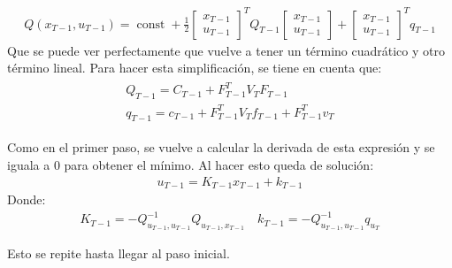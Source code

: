 \begin{align}
Q ( x _ { T - 1 } , u _ { T - 1 } ) = \operatorname { const } + \frac { 1 } { 2 } \left[ \begin{array} { c } { x _ { T - 1 } } \\ { u _ { T - 1 } } \end{array} \right] ^ { T } Q _ { T - 1 } \left[ \begin{array} { c } { x _ { T - 1 } } \\ { u _ { T - 1 } } \end{array} \right] + \left[ \begin{array} { c } { x _ { T - 1 } } \\ { u _ { T - 1 } } \end{array} \right] ^ { T } q _ { T - 1 }
\end{align}
Que se puede ver perfectamente que vuelve a tener un término cuadrático y otro término lineal.
Para hacer esta simplificación, se tiene en cuenta que:
\begin{align}
\left. \begin{array} { l } { Q _ { T - 1 } = C _ { T - 1 } + F _ { T - 1 } ^ { T } V _ { T } F _ { T - 1 } } \\ { q _ { T - 1 } = c _ { T - 1 } + F _ { T - 1 } ^ { T } V _ { T } f _ { T - 1 } + F _ { T - 1 } ^ { T } v _ { T } } \end{array} \right.
\end{align}

Como en el primer paso, se vuelve a calcular la derivada de esta expresión y se iguala a 0 para
obtener el mínimo. Al hacer esto queda de solución:
\begin{align}
u _ { T - 1 } = K _ { T - 1 } x _ { T - 1 } + k _ { T - 1 }
\end{align}
Donde:
\begin{align}
K _ { T - 1 } = - Q _ { u _ { T - 1 } , u _ { T - 1 } } ^ { - 1 } Q _ { u _ { T - 1 } , x _ { T - 1 } } \quad k _ { T - 1 } = - Q _ { u _ { T - 1 } , u _ { T - 1 } } ^ { - 1 } q _ { u _ { T } }
\end{align}

Esto se repite hasta llegar al paso inicial.

